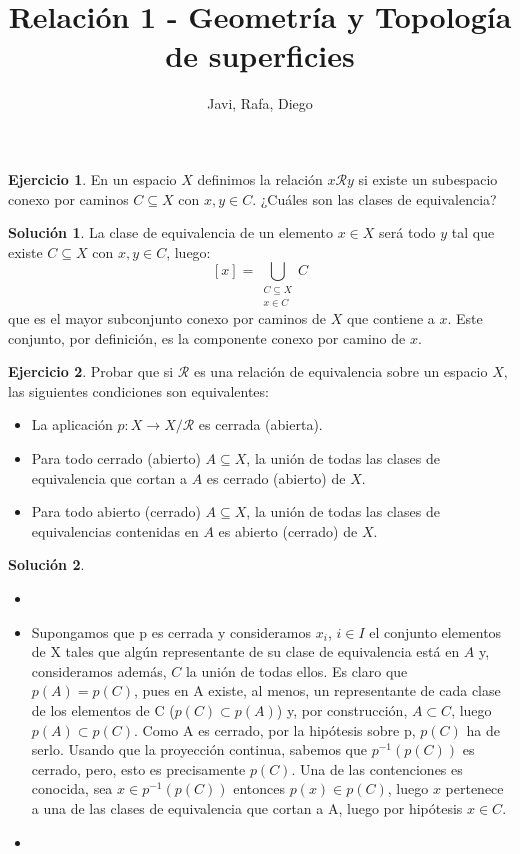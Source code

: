 \documentclass{article}
\theoremstyle{plain}
\theoremstyle{definition}
\newtheorem{exercise}{Ejercicio}
\newtheorem*{sol*}{Solución}
\begin{document}
\title{Relación 1 - Geometría y Topología de superficies }
\author{Javi, Rafa, Diego}
\maketitle
\begin{exercise}
En un espacio $X$ definimos la relación $x \mathcal{R} y$ si existe un subespacio conexo por caminos $C \subseteq X$ con $x,y \in C$. ¿Cuáles son las clases de equivalencia?
\end{exercise}
\begin{sol*}
La clase de equivalencia de un elemento $x \in X$ será todo $y$ tal que existe $C \subseteq X$ con $x, y \in C$, luego:
\[ [x] = \bigcup_{\substack{C \subseteq X \\ x \in C}} C \]
que es el mayor subconjunto conexo por caminos de $X$ que contiene a $x$. Este conjunto, por definición, es la componente conexo por camino de $x$.
\end{sol*}

\newpage
\begin{exercise}
Probar que si $\mathcal{R}$ es una relación de equivalencia sobre un espacio $X$, las siguientes condiciones son equivalentes:
\begin{itemize}
	\item La aplicación $p : X \to X/\mathcal{R}$ es cerrada (abierta).
	\item Para todo cerrado (abierto) $A \subseteq X$, la unión de todas las clases de equivalencia que cortan a $A$ es cerrado (abierto) de $X$.
	\item Para todo abierto (cerrado) $A \subseteq X$, la unión de todas las clases de equivalencias contenidas en $A$ es abierto (cerrado) de $X$.
\end{itemize}
\end{exercise}
\begin{sol*}
\begin{itemize}
\item[]
\item Supongamos que p es cerrada y consideramos $x_i$, $i\in I$ el conjunto elementos de X tales que algún representante de su clase de equivalencia está en $A$ y, consideramos además, $C$ la unión de todas ellos. Es claro que $p(A) = p(C)$, pues en A existe, al menos, un representante de cada clase de los elementos de C ($p(C)\subset p(A)$) y, por construcción, $A\subset C$, luego $p(A)\subset p(C)$. Como A es cerrado, por la hipótesis sobre p, $p(C)$ ha de serlo. Usando que la proyección continua, sabemos que $p^{-1}(p(C))$ es cerrado, pero, esto es precisamente $p(C)$. Una de las contenciones es conocida, sea $x\in p^{-1}(p(C))$ entonces $p(x) \in p(C)$, luego $x$ pertenece a una de las clases de equivalencia que cortan a A, luego por hipótesis $x\in C$.
\item 
\end{itemize}
\end{sol*}
\end{document}
